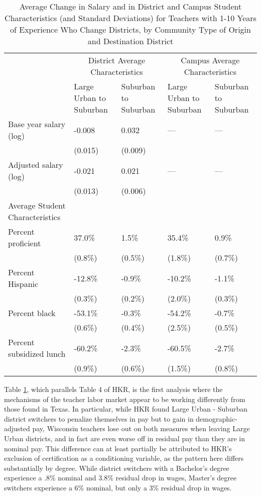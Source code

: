 \documentclass[]{article}
\begin{document}
\begin{table}[htbp]
\centering
\begin{tabular}{lp{}p{}p{}p{}}
  \hline
 & \multicolumn{2}{c}{District Average Characteristics} & \multicolumn{2}{c}{Campus Average Characteristics}\\ \cline{2-5}
 & Large Urban to Suburban & Suburban to Suburban & Large Urban to Suburban & Suburban to Suburban \\
  \hline
Base year salary (log) & -0.008 & 0.032 & --- & --- \\ 
   & (0.015) & (0.009) &  &  \\ 
  Adjusted salary (log) & -0.021 & 0.021 & --- & --- \\ 
   & (0.013) & (0.006) &  &  \\ 
Average Student Characteristics & & & & \\
  \quad Percent proficient & 37.0\% & 1.5\% & 35.4\% & 0.9\% \\ 
   & (0.8\%) & (0.5\%) & (1.8\%) & (0.7\%) \\ 
  \quad Percent Hispanic & -12.8\% & -0.9\% & -10.2\% & -1.1\% \\ 
   & (0.3\%) & (0.2\%) & (2.0\%) & (0.3\%) \\ 
  \quad Percent black & -53.1\% & -0.3\% & -54.2\% & -0.7\% \\ 
   & (0.6\%) & (0.4\%) & (2.5\%) & (0.5\%) \\ 
  \quad Percent subsidized lunch & -60.2\% & -2.3\% & -60.5\% & -2.7\% \\ 
   & (0.9\%) & (0.6\%) & (1.5\%) & (0.8\%) \\ 
   \hline
\end{tabular}
\caption{Average Change in Salary and in District and Campus Student Characteristics (and Standard Deviations) for Teachers with 1-10 Years of Experience Who Change Districts, by Community Type of Origin and Destination District} 
\label{tbl:change_by_urb}
\end{table}

Table \ref{tbl:change_by_urb}, which parallels Table 4 of HKR, is the
first analysis where the mechanisms of the teacher labor market appear
to be working differently from those found in Texas. In particular,
while HKR found Large Urban - Suburban district switchers to penalize
themselves in pay but to gain in demographic-adjusted pay, Wisconsin
teachers lose out on both measures when leaving Large Urban districts,
and in fact are even worse off in residual pay than they are in nominal
pay. This difference can at least partially be attributed to HKR's
exclusion of certification as a conditioning variable, as the pattern
here differs substantially by degree. While district switchers with a
Bachelor's degree experience a .8\% nominal and 3.8\% residual drop in
wages, Master's degree switchers experience a 6\% nominal, but only a
3\% residual drop in wages.
\end{document}
